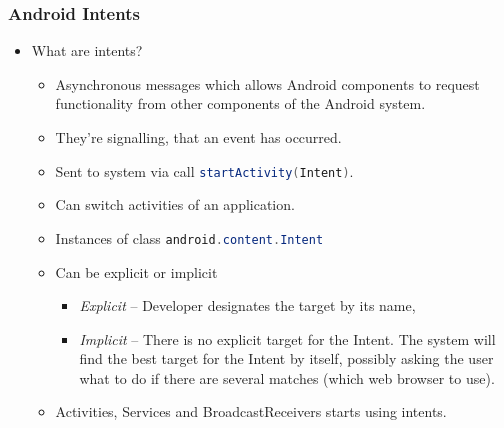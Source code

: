 \documentclass[10pt,xcolor=pdflatex]{beamer}
\newcommand{\inlinejava}{\lstinline[language={Java},basicstyle=\ttfamily,keepspaces]}
\newcommand{\radkovani}[1]{\renewcommand{\baselinestretch}{#1}}
\begin{document}
\begin{frame}[fragile]\frametitle{Android Intents}
	\begin{itemize}
		\item What are intents?
        \radkovani{1.3}
        \begin{itemize}
        	\footnotesize
        	\item Asynchronous messages which allows Android components to request functionality from other components of the Android system.
        	\item They're signalling, that an event has occurred.
        	\item Sent to system via call {\color{red}\inlinejava{startActivity(Intent)}}.
        	\item Can switch activities of an application.
        	\item Instances of class \inlinejava{android.content.Intent}
        	\item Can be explicit or implicit
              \begin{itemize}
            	\footnotesize
            	\item \emph{Explicit} -- Developer designates the target by its name,
                \item \emph{Implicit} -- There is no explicit target for the Intent. The system will find the best target for the Intent by itself, possibly asking the user what to do if there are several matches (which web browser to use).
              \end{itemize}
			\item Activities, Services and BroadcastReceivers starts using intents.
        \end{itemize}
		\radkovani{1}
	\end{itemize}
\end{frame}
\end{document}
